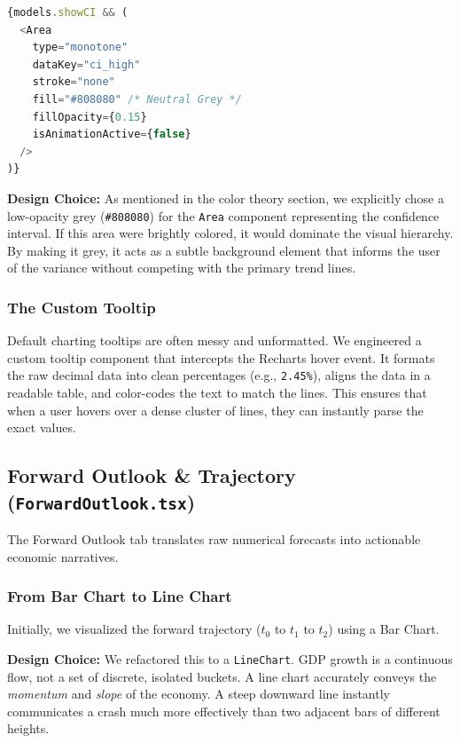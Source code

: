 \documentclass[12pt]{article}
\begin{document}
\begin{lstlisting}[language=JavaScript, caption=Rendering the Confidence Interval]
{models.showCI && (
  <Area
    type="monotone"
    dataKey="ci_high"
    stroke="none"
    fill="#808080" /* Neutral Grey */
    fillOpacity={0.15}
    isAnimationActive={false}
  />
)}
\end{lstlisting}

\textbf{Design Choice:} As mentioned in the color theory section, we explicitly chose a low-opacity grey (\texttt{\#808080}) for the \texttt{Area} component representing the confidence interval. If this area were brightly colored, it would dominate the visual hierarchy. By making it grey, it acts as a subtle background element that informs the user of the variance without competing with the primary trend lines.

\subsubsection{The Custom Tooltip}
Default charting tooltips are often messy and unformatted. We engineered a custom tooltip component that intercepts the Recharts hover event. It formats the raw decimal data into clean percentages (e.g., \texttt{2.45\%}), aligns the data in a readable table, and color-codes the text to match the lines. This ensures that when a user hovers over a dense cluster of lines, they can instantly parse the exact values.

\subsection{Forward Outlook \& Trajectory (\texttt{ForwardOutlook.tsx})}
The Forward Outlook tab translates raw numerical forecasts into actionable economic narratives. 

\subsubsection{From Bar Chart to Line Chart}
Initially, we visualized the forward trajectory ($t_0$ to $t_1$ to $t_2$) using a Bar Chart. 

\textbf{Design Choice:} We refactored this to a \texttt{LineChart}. GDP growth is a continuous flow, not a set of discrete, isolated buckets. A line chart accurately conveys the \textit{momentum} and \textit{slope} of the economy. A steep downward line instantly communicates a crash much more effectively than two adjacent bars of different heights.
\end{document}
